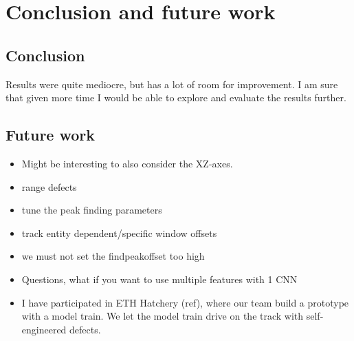 
\chapter{Conclusion and future work}

\section{Conclusion}
Results were quite mediocre, but has a lot of room for improvement. I am sure that given more time I would be able to explore and evaluate the results further.
\section{Future work}

\begin{itemize}
	\item Might be interesting to also consider the XZ-axes.
	\item range defects
	\item tune the peak finding parameters
	\item track entity dependent/specific window offsets
	\item we must not set the findpeakoffset too high
	\item Questions, what if you want to use multiple features with 1 CNN
	\item I have participated in ETH Hatchery (ref), where our team build a prototype with a model train. We let the model train drive on the track with self-engineered defects.

\end{itemize}

\newpage
